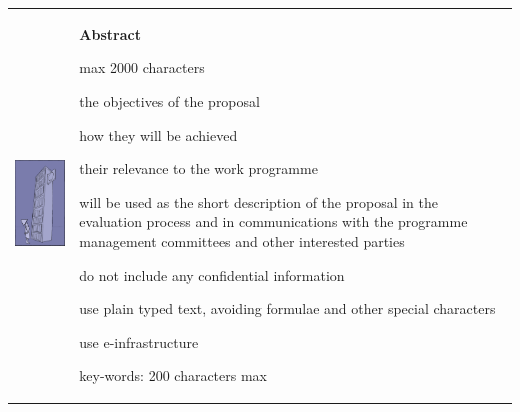 \documentclass[12pt,noworkareas,deliverables,report\classoptions]{euproposal}
\begin{document}
\begin{proposal}
\medskip
\hspace{-0.8cm}
\begin{tabular}{p{}p{}}
\begin{minipage}{0.3\textwidth}
\includegraphics[width=4cm]{img/Illustration1.jpg}
\end{minipage}
&
\begin{minipage}{10cm}
  \begin{center}\bfseries Abstract\end{center}
    max 2000 characters

    the objectives of the proposal

    how they will be achieved

    their relevance to the work programme

    will be used as the short description  of the proposal in the evaluation process and in communications  with the programme management committees and other interested parties

    do not include any confidential information

    use plain typed text, avoiding formulae and other special characters

    use e-infrastructure

    key-words: 200 characters max
\end{minipage}
\end{tabular}

  \vfil\null\newpage
  \tableofcontents


\newpage

\newpage

\newpage
\renewcommand\addcontentsline[3]{}

\newpage


\end{proposal}
\end{document}
